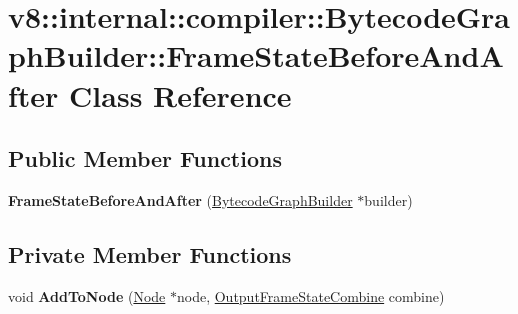 \hypertarget{classv8_1_1internal_1_1compiler_1_1_bytecode_graph_builder_1_1_frame_state_before_and_after}{}\section{v8\+:\+:internal\+:\+:compiler\+:\+:Bytecode\+Graph\+Builder\+:\+:Frame\+State\+Before\+And\+After Class Reference}
\label{classv8_1_1internal_1_1compiler_1_1_bytecode_graph_builder_1_1_frame_state_before_and_after}
\subsection*{Public Member Functions}
\begin{DoxyCompactItemize}
\item 
{\bfseries Frame\+State\+Before\+And\+After} (\hyperlink{classv8_1_1internal_1_1compiler_1_1_bytecode_graph_builder}{Bytecode\+Graph\+Builder} $\ast$builder)\hypertarget{classv8_1_1internal_1_1compiler_1_1_bytecode_graph_builder_1_1_frame_state_before_and_after_a854bd85629dba9f0f726368d6a081f63}{}\label{classv8_1_1internal_1_1compiler_1_1_bytecode_graph_builder_1_1_frame_state_before_and_after_a854bd85629dba9f0f726368d6a081f63}

\end{DoxyCompactItemize}
\subsection*{Private Member Functions}
\begin{DoxyCompactItemize}
\item 
void {\bfseries Add\+To\+Node} (\hyperlink{classv8_1_1internal_1_1compiler_1_1_node}{Node} $\ast$node, \hyperlink{classv8_1_1internal_1_1compiler_1_1_output_frame_state_combine}{Output\+Frame\+State\+Combine} combine)\hypertarget{classv8_1_1internal_1_1compiler_1_1_bytecode_graph_builder_1_1_frame_state_before_and_after_ad67d753b650f9fcade219cba68d27769}{}\label{classv8_1_1internal_1_1compiler_1_1_bytecode_graph_builder_1_1_frame_state_before_and_after_ad67d753b650f9fcade219cba68d27769}

\end{DoxyCompactItemize}
